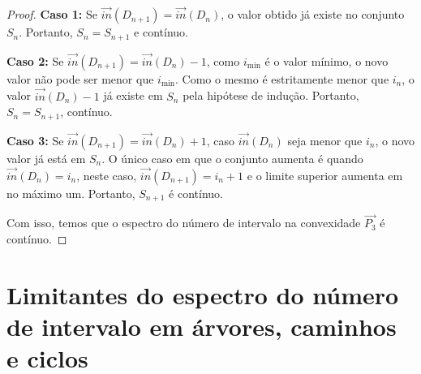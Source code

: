 \begin{proof}
  \noindent \textbf{Caso 1:} Se $\overrightarrow{in}(D_{n+1}) = \overrightarrow{in}(D_n)$, o valor obtido já existe no conjunto $S_n$. Portanto, $S_n = S_{n+1}$ e contínuo.

  \noindent \textbf{Caso 2:} Se $\overrightarrow{in}(D_{n+1}) = \overrightarrow{in}(D_n)-1$, como $i_{\min}$ é o valor mínimo, o novo valor não pode ser menor que $i_{\min}$. Como o mesmo é estritamente menor que $i_{n}$, o valor $\overrightarrow{in}(D_n)-1$ já existe em $S_n$ pela hipótese de indução. Portanto, $S_n = S_{n+1}$, contínuo.

  \noindent \textbf{Caso 3:} Se $\overrightarrow{in}(D_{n+1}) = \overrightarrow{in}(D_n)+1$, caso $\overrightarrow{in}(D_n)$ seja menor que $i_{n}$, o novo valor já está em $S_n$. O único caso em que o conjunto aumenta é quando $\overrightarrow{in}(D_n) = i_n$, neste caso, $\overrightarrow{in}(D_{n+1}) = i_n + 1$ e o limite superior aumenta em no máximo um. Portanto, $S_{n+1}$ é contínuo.

  Com isso, temos que o espectro do número de intervalo na convexidade $\overrightarrow{P_3}$ é contínuo.

\end{proof}




\section{Limitantes do espectro do número de intervalo em árvores, caminhos e ciclos}


